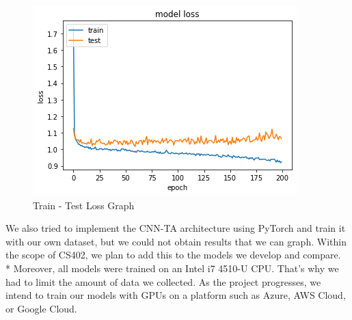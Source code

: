 \documentclass{article}
\begin{document}
\begin{figure}[H]
    \begin{center}
        \includegraphics[scale=0.6]{Assets/loss_vt.png}
        \caption{Train - Test Loss Graph}
    \end{center}
\end{figure}
\noindent
We also tried to implement the CNN-TA architecture using PyTorch and train it with our own dataset, but we could not obtain results that we can graph. Within the scope of CS402, we plan to add this to the models we develop and compare.\vspace{0.2cm} \\*
Moreover, all models were trained on an Intel i7 4510-U CPU. That's why we had to limit the amount of data we collected. \newline
As the project progresses, we intend to train our models with GPUs on a platform such as Azure, AWS Cloud, or Google Cloud.
\end{document}
